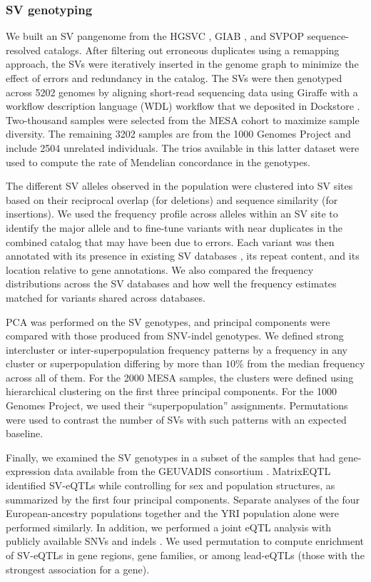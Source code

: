 \documentclass[11pt]{ucscthesis}
\begin{document}
\subsubsection{SV genotyping}
We built an SV pangenome from the HGSVC \cite{chaisson_sv_2019}, GIAB \cite{zook_robust_2020}, and SVPOP \cite{audano2019c} sequence-resolved catalogs.
After filtering out erroneous duplicates using a remapping approach, the SVs were iteratively inserted in the genome graph to minimize the effect of errors and redundancy in the catalog.
The SVs were then genotyped across 5202 genomes by aligning short-read sequencing data using Giraffe with a workflow description language (WDL) workflow that we deposited in Dockstore \cite{vgsv_dockstore}.
Two-thousand samples were selected from the MESA cohort to maximize sample diversity.
The remaining 3202 samples are from the 1000 Genomes Project and include 2504 unrelated individuals. The trios available in this latter dataset were used to compute the rate of Mendelian concordance in the genotypes.

The different SV alleles observed in the population were clustered into SV sites based on their reciprocal overlap (for deletions) and sequence similarity (for insertions).
We used the frequency profile across alleles within an SV site to identify the major allele and to fine-tune variants with near duplicates in the combined catalog that may have been due to errors.
Each variant was then annotated with its presence in existing SV databases \cite{audano2019c,1000gp_sv_2015,gnomadsv_2020}, its repeat content, and its location relative to gene annotations.
We also compared the frequency distributions across the SV databases and how well the frequency estimates matched for variants shared across databases.

PCA was performed on the SV genotypes, and principal components were compared with those produced from SNV-indel genotypes.
We defined strong intercluster or inter-superpopulation frequency patterns by a frequency in any cluster or superpopulation differing by more than $10\%$ from the median frequency across all of them.
For the 2000 MESA samples, the clusters were defined using hierarchical clustering on the first three principal components.
For the 1000 Genomes Project, we used their “superpopulation” assignments.
Permutations were used to contrast the number of SVs with such patterns with an expected baseline.

Finally, we examined the SV genotypes in a subset of the samples that had gene-expression data available from the GEUVADIS consortium \cite{geuvadis_2013}.
MatrixEQTL \cite{matrix_eqtl_2012} identified SV-eQTLs while controlling for sex and population structures, as summarized by the first four principal components.
Separate analyses of the four European-ancestry populations together and the YRI population alone were performed similarly.
In addition, we performed a joint eQTL analysis with publicly available SNVs and indels \cite{1000gp_nygc_2021}.
We used permutation to compute enrichment of SV-eQTLs in gene regions, gene families, or among lead-eQTLs (those with the strongest association for a gene).
\end{document}
